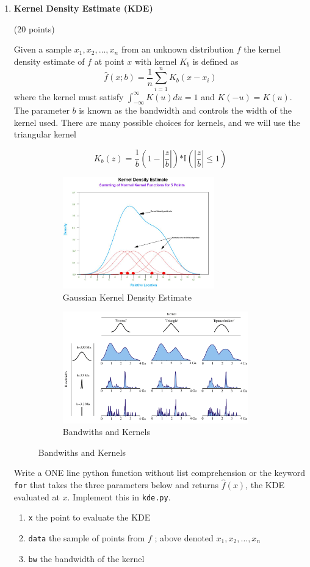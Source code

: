 \documentclass{article}
\newcounter{points}
\newcommand\setpoints[1]{\addtocounter{points}{#1}(#1 points)}
\begin{document}
\begin{enumerate}
\newpage
\item \textbf{Kernel Density Estimate (KDE)} \setpoints{20}

Given a sample $x_1, x_2, \dots, x_n$ from an unknown distribution $f$ the kernel density estimate of $f$ at point $x$ with kernel $K_b$ is defined as 
$$\hat{f}(x;b) = \frac{1}{n}\sum_{i=1}^{n}K_b(x-x_i)$$
where the kernel must satisfy $\int_{-\infty}^{\infty}K(u)du = 1$ and $K(-u) = K(u).$ The parameter $b$ is known as the bandwidth and controls the width of the kernel used. There are many possible choices for kernels, and we will use the triangular kernel

$$K_{b}(z) = \frac{1}{b}(1 - |\frac{z}{b}|)\mathbb{*I}(|\frac{z}{b} |\leq 1)$$ 

\begin{figure}[h!!!]
        \centering
        \begin{subfigure}[b]{0.48\textwidth}
        \centering
        \includegraphics[height=1.9in, natwidth=410,natheight=442]{kde}
        \caption{Gaussian Kernel Density Estimate}
        \label{fig:gkde}
        \end{subfigure}
        \quad
        \centering
        \begin{subfigure}[b]{0.48\textwidth}
        \centering
        \includegraphics[height=1.9in, natwidth=410,natheight=442]{bw}
        \caption{Bandwiths and Kernels}
        \label{fig:bw}
        \end{subfigure}
\end{figure}

Write a ONE line python function without list comprehension or the keyword \texttt{for} that takes the three parameters below and returns $\hat{f}(x)$, the KDE evaluated at $x$.  Implement this in \texttt{kde.py}. 
\begin{enumerate}
\item \texttt{x} the point to evaluate the KDE
\item \texttt{data}  the sample of points from $f$  ; above denoted $x_1, x_2, \dots, x_n$ 
\item \texttt{bw} the bandwidth of the kernel
\end{enumerate}




\end{enumerate}
\end{document}
